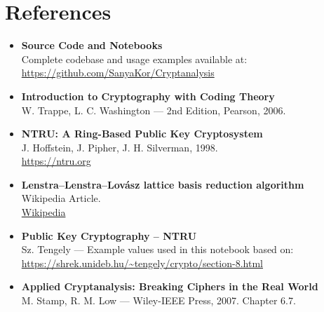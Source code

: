 \documentclass[a4paper,12pt]{article}
\begin{document}




\newpage
\section{References}
\vspace{0.5em}
\begin{itemize}
    \item \textbf{Source Code and Notebooks} \\
    Complete codebase and usage examples available at: \\
    \url{https://github.com/SanyaKor/Cryptanalysis}
    \item \textbf{Introduction to Cryptography with Coding Theory} \\
    W. Trappe, L. C. Washington — 2nd Edition, Pearson, 2006.

    \item \textbf{NTRU: A Ring-Based Public Key Cryptosystem} \\
    J. Hoffstein, J. Pipher, J. H. Silverman, 1998. \\
    \url{https://ntru.org}

    \item \textbf{Lenstra--Lenstra--Lovász lattice basis reduction algorithm} \\
    Wikipedia Article. \\
\href{https://en.wikipedia.org/wiki/Lenstra%E2%80%93Lenstra%E2%80%93Lov%C3%A1sz_lattice_basis_reduction_algorithm}{Wikipedia}

    \item \textbf{Public Key Cryptography – NTRU} \\
    Sz. Tengely — Example values used in this notebook based on: \\
    \url{https://shrek.unideb.hu/~tengely/crypto/section-8.html}

    \item \textbf{Applied Cryptanalysis: Breaking Ciphers in the Real World} \\
    M. Stamp, R. M. Low — Wiley-IEEE Press, 2007. Chapter 6.7.
\end{itemize}
\end{document}
